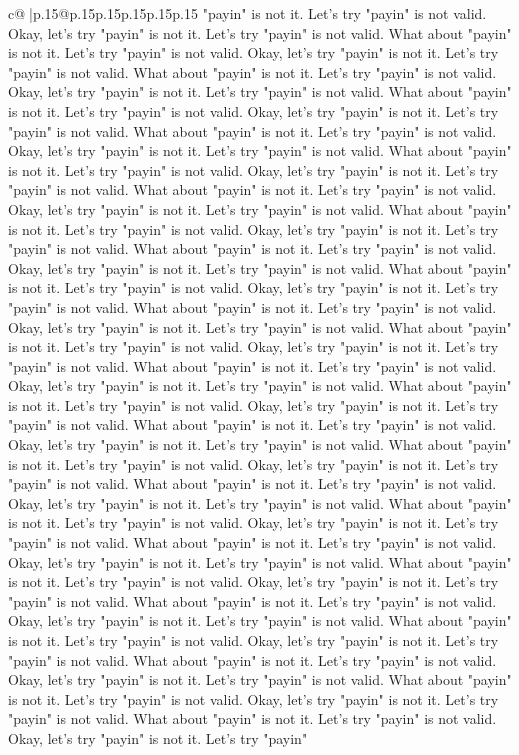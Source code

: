 \documentclass{article}
\begin{document}
{\begin{supertabular}{c@{$\;$}|p{.15\linewidth}@{}p{.15\linewidth}p{.15\linewidth}p{.15\linewidth}p{.15\linewidth}p{.15\linewidth}}
{{{"payin" is not it. Let's try "payin" is not valid. Okay, let's try "payin" is not it. Let's try "payin" is not valid. What about "payin" is not it. Let's try "payin" is not valid. Okay, let's try "payin" is not it. Let's try "payin" is not valid. What about "payin" is not it. Let's try "payin" is not valid. Okay, let's try "payin" is not it. Let's try "payin" is not valid. What about "payin" is not it. Let's try "payin" is not valid. Okay, let's try "payin" is not it. Let's try "payin" is not valid. What about "payin" is not it. Let's try "payin" is not valid. Okay, let's try "payin" is not it. Let's try "payin" is not valid. What about "payin" is not it. Let's try "payin" is not valid. Okay, let's try "payin" is not it. Let's try "payin" is not valid. What about "payin" is not it. Let's try "payin" is not valid. Okay, let's try "payin" is not it. Let's try "payin" is not valid. What about "payin" is not it. Let's try "payin" is not valid. Okay, let's try "payin" is not it. Let's try "payin" is not valid. What about "payin" is not it. Let's try "payin" is not valid. Okay, let's try "payin" is not it. Let's try "payin" is not valid. What about "payin" is not it. Let's try "payin" is not valid. Okay, let's try "payin" is not it. Let's try "payin" is not valid. What about "payin" is not it. Let's try "payin" is not valid. Okay, let's try "payin" is not it. Let's try "payin" is not valid. What about "payin" is not it. Let's try "payin" is not valid. Okay, let's try "payin" is not it. Let's try "payin" is not valid. What about "payin" is not it. Let's try "payin" is not valid. Okay, let's try "payin" is not it. Let's try "payin" is not valid. What about "payin" is not it. Let's try "payin" is not valid. Okay, let's try "payin" is not it. Let's try "payin" is not valid. What about "payin" is not it. Let's try "payin" is not valid. Okay, let's try "payin" is not it. Let's try "payin" is not valid. What about "payin" is not it. Let's try "payin" is not valid. Okay, let's try "payin" is not it. Let's try "payin" is not valid. What about "payin" is not it. Let's try "payin" is not valid. Okay, let's try "payin" is not it. Let's try "payin" is not valid. What about "payin" is not it. Let's try "payin" is not valid. Okay, let's try "payin" is not it. Let's try "payin" is not valid. What about "payin" is not it. Let's try "payin" is not valid. Okay, let's try "payin" is not it. Let's try "payin" is not valid. What about "payin" is not it. Let's try "payin" is not valid. Okay, let's try "payin" is not it. Let's try "payin" is not valid. What about "payin" is not it. Let's try "payin" is not valid. Okay, let's try "payin" is not it. Let's try "payin" is not valid. What about "payin" is not it. Let's try "payin" is not valid. Okay, let's try "payin" is not it. Let's try "payin" is not valid. What about "payin" is not it. Let's try "payin" is not valid. Okay, let's try "payin" is not it. Let's try "payin" is not valid. What about "payin" is not it. Let's try "payin" is not valid. Okay, let's try "payin" is not it. Let's try "payin" is not valid. What about "payin" is not it. Let's try "payin" is not valid. Okay, let's try "payin" is not it. Let's try "payin" }}}
\end{supertabular}}
\end{document}
